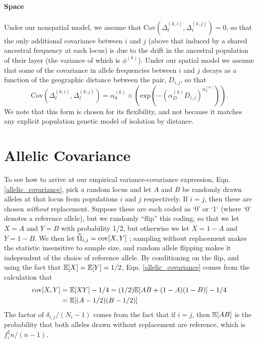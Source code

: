 \documentclass[12pt]{article}
\begin{document}
\paragraph{Space}
Under our nonspatial model, 
we assume that $\text{Cov}(\Delta^{(k,i)}_{\ell},\Delta^{(k,j)}_{\ell})=0$,
so that the only additional covariance between $i$ and $j$ 
(above that induced by a shared ancestral frequency at each locus)
is due to the drift in the ancestral population of their layer 
(the variance of which is $\phi^{(k)}$). 
Under our spatial model we assume that some of the covariance in allele frequencies
between $i$ and $j$ decays as a function of the geographic distance
between the pair, $D_{i,j}$,
so that 
\begin{equation}
\text{Cov}(\Delta^{(k,i)}_{\ell},\Delta^{(k,j)}_{\ell}) = \alpha^{(k)}_0 \times \left(\text{exp} \left(  -(\alpha^{(k)}_D D_{i,j})^{\alpha^{(k)}_2}\right) \right) .
\end{equation}
We note that this form is chosen for its flexibility, 
and not because it matches any explicit population genetic model of isolation by distance. 

\section{Allelic Covariance}\label{allelic_cov}
To see how to arrive at our empirical variance-covariance expression, Eqn. \eqref{allelic_covariance},
pick a random locus and
let $A$ and $B$ be randomly drawn alleles at that locus from populations $i$ and $j$ respectively.
If $i=j$, then these are chosen \emph{without} replacement.
Suppose these are each coded as `0' or `1` (where `0' denotes a reference allele),
but we randomly ``flip'' this coding, so that we let $X=A$ and $Y=B$ with probability 1/2,
but otherwise we let $X=1-A$ and $Y=1-B$.
We then let $\widehat{\Omega}_{i,j} = \mathop{\mbox{cov}}[X,Y]$ ; 
sampling without replacement makes the statistic insensitive to sample size,
and random allele flipping makes it independent of the choice of reference allele.
By conditioning on the flip,
and using the fact that $\mathbb{E}[X] = \mathbb{E}[Y] = 1/2$,
Eqn. \eqref{allelic_covariance} comes from the calculation that
\begin{align}
\mathop{\mbox{cov}}[X,Y] &= \mathbb{E}[XY] - 1/4 = (1/2)\mathbb{E}[AB + (1-A)(1-B)] - 1/4\\\notag
&= \mathbb{E}[(A-1/2)(B-1/2)]
\end{align}
The factor of $\delta_{i,j}/(N_i-1)$ comes from the fact that if $i=j$,
then $\mathbb{E}[AB]$ is the probability that both alleles drawn without replacement are reference,
which is $f_i^2 n/(n-1)$.
\end{document}
